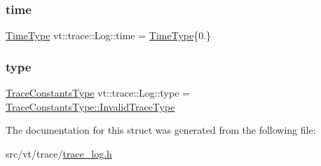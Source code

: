 \mbox{\label{structvt_1_1trace_1_1_log_ad707df71373f1f27df811868ea39bd3a}} 
\subsubsection{\texorpdfstring{time}{time}}
{\footnotesize\ttfamily \hyperlink{namespacevt_a2b9f28078dc309ad0706b69ded743e69}{Time\+Type} vt\+::trace\+::\+Log\+::time = \hyperlink{namespacevt_a2b9f28078dc309ad0706b69ded743e69}{Time\+Type}\{0.\}}

\mbox{\label{structvt_1_1trace_1_1_log_a6415eacd3721d71029ff6edb909fc63d}} 
\subsubsection{\texorpdfstring{type}{type}}
{\footnotesize\ttfamily \hyperlink{namespacevt_1_1trace_acf454dfbd581b0ebae895f90b5927a1d}{Trace\+Constants\+Type} vt\+::trace\+::\+Log\+::type = \hyperlink{namespacevt_1_1trace_acf454dfbd581b0ebae895f90b5927a1da319f6b5fbfb85275879d449149167c7e}{Trace\+Constants\+Type\+::\+Invalid\+Trace\+Type}}



The documentation for this struct was generated from the following file\+:\begin{DoxyCompactItemize}
\item 
src/vt/trace/\hyperlink{trace__log_8h}{trace\+\_\+log.\+h}\end{DoxyCompactItemize}
